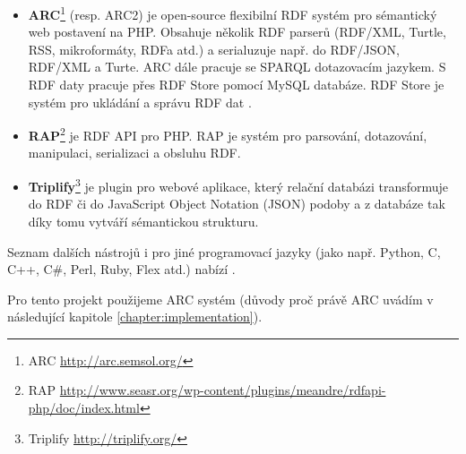 \begin{itemize}
\item \textbf{ARC}\footnote{ARC \url{http://arc.semsol.org/}} (resp. ARC2) je open-source flexibilní RDF systém pro sémantický web postavení na PHP. Obsahuje několik RDF parserů (RDF/XML, Turtle, RSS, mikroformáty, RDFa atd.) a serialuzuje např. do RDF/JSON, RDF/XML a Turte. ARC dále pracuje se SPARQL dotazovacím jazykem. 
S RDF daty pracuje přes RDF Store pomocí MySQL databáze. 
RDF Store je systém pro ukládání a správu RDF dat \cite{rdfstore}. 

\item \textbf{RAP}\footnote{RAP \url{http://www.seasr.org/wp-content/plugins/meandre/rdfapi-php/doc/index.html}} je RDF API pro PHP. RAP je systém pro parsování, dotazování, manipulaci, serializaci a obsluhu RDF. 

\item \textbf{Triplify}\footnote{Triplify \url{http://triplify.org/}} je plugin pro webové aplikace, který relační databázi transformuje do RDF či do JavaScript Object Notation (JSON) podoby a z databáze tak díky tomu vytváří sémantickou strukturu.
\end{itemize}

Seznam dalších nástrojů i pro jiné programovací jazyky (jako např. Python, C, C++, C\#, Perl, Ruby, Flex atd.) nabízí \cite{semwebtools}.

Pro tento projekt použijeme ARC systém (důvody proč právě ARC uvádím v následující kapitole \ref{chapter:implementation}).  